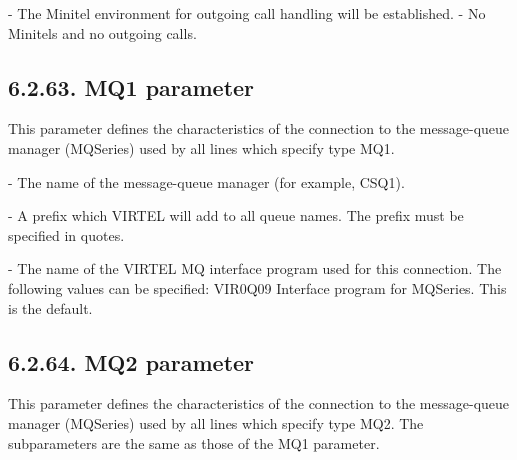 \documentclass[letterpaper,10pt,english]{sphinxmanual}
\begin{document}
 - The Minitel environment for outgoing call handling will be established.
 - No Minitels and no outgoing calls.


\subsection{6.2.63. MQ1 parameter}
\label{\detokenize{Installation_Guide:mq1-parameter}}
\begin{sphinxVerbatim}[commandchars=\\\{\}]
\PYG{p}{[}\PYG{p}{]}           
\end{sphinxVerbatim}

This parameter defines the characteristics of the connection to the message-queue manager (MQSeries) used by all lines which specify type MQ1.

 - The name of the message-queue manager (for example, CSQ1).

 - A prefix which VIRTEL will add to all queue names. The prefix must be specified in quotes.

 - The name of the VIRTEL MQ interface program used for this connection. The following values can be specified: VIR0Q09 Interface program for MQSeries. This is the default.


\subsection{6.2.64. MQ2 parameter}
\label{\detokenize{Installation_Guide:mq2-parameter}}
\begin{sphinxVerbatim}[commandchars=\\\{\}]
\PYG{p}{[}\PYG{p}{]}             
\end{sphinxVerbatim}

This parameter defines the characteristics of the connection to the message-queue manager (MQSeries) used by all lines which specify type MQ2. The subparameters are the same as those of the MQ1 parameter.
\end{document}
